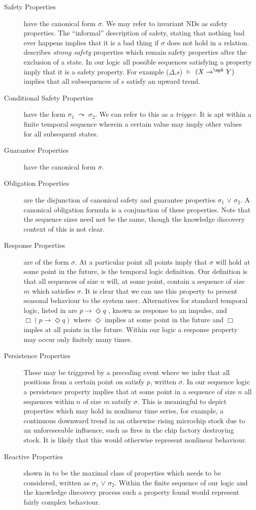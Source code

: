 \begin{description}
\item[Safety Properties] have the canonical form  $\sigma$. We may
refer to invariant NDs as safety properties. The ``informal''
description of safety, stating that nothing bad ever happens implies
that it is a bad thing if $\sigma$ does not hold in a
relation. \cite{sis94} describes {\em strong safety} properties which
remain safety properties after the exclusion of a state. In our logic
all possible sequences satisfying a property imply that it is a safety
property.  For example ($\Delta$,$s$) $\models$  $(X \to^{\up k} Y)$ implies that all
subsequences of $s$ satisfy an upward trend.
\item[Conditional Safety Properties] have the form $\sigma_1$ $\leadsto$
 $\sigma_2$. We
can refer to this as a {\em trigger}. It is apt within a finite
temporal sequence wherein a certain value may imply other values for all
subsequent states.
\item[Guarantee Properties] have the canonical form  $\sigma$.
\item[Obligation Properties] are the disjunction of canonical safety
and guarantee properties  $\sigma_1$ $\vee$ 
$\sigma_2$. A canonical
obligation formula is a conjunction of these properties. Note that the
sequence sizes need not be the same, though the knowledge discovery
context of this is not clear.
\item[Response Properties] are of the form  $\sigma$. At a particular
point all points imply that $\sigma$ will hold at some point in the
future, is the temporal logic definition. Our definition is that 
all sequences of size $n$ will, at some point, contain a sequence of
size $m$ which satisfies $\sigma$. It is clear that we can use this
property to present seasonal behaviour to the system user.
Alternatives for standard temporal logic, listed in \cite{mp92} are $p \to \Diamond q$ ,
known as response to an impulse, and
$\Box(p \to \Diamond q)$ where $\Diamond$ implies at some point in the
future and $\Box$ imples at all points in the future.
Within our logic a response property may occur only finitely
many times.
\item[Persistence Properties] These may be triggered by a preceding
event where we infer that all positions from a certain point on
satisfy $p$, written  $\sigma$. In our sequence logic a
persistence property implies that at some point in a sequence of size
$n$ all sequences within $n$ of size $m$ satsify $\sigma$. This is
meaningful to depict properties which may hold in nonlinear time
series, for example, a continuous downward trend in an otherwise
rising microchip stock
due to an unforeseeable influence, such as fires in the chip factory
destroying stock. It is likely that this would otherwise represent
nonlinear behaviour.
\item[Reactive Properties] shown in \cite{mp92} to be the maximal
class of properties which needs to be considered, written as
 $\sigma_1$ $\vee$  $\sigma_2$. Within the
finite sequence of our logic and the knowledge discovery process such
a property found would represent fairly complex behaviour.
\end{description}
